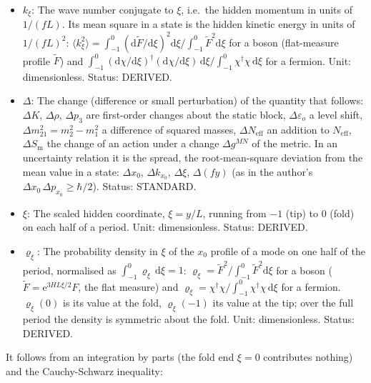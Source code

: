 \documentclass[
  10pt,
]{article}
\providecommand{\tightlist}{%
  \setlength{\itemsep}{0pt}\setlength{\parskip}{0pt}}
\begin{document}
\begin{itemize}
\tightlist
\item
  \(k_\xi\): The wave number conjugate to \(\xi\), i.e.~the hidden
  momentum in units of \(1/(fL)\). Its mean square in a state is the
  hidden kinetic energy in units of \(1/(fL)^2\):
  \(\langle k_\xi^2\rangle = \int_{-1}^{0}(\mathrm{d}\tilde F/\mathrm{d}\xi)^2\mathrm{d}\xi\big/\int_{-1}^{0}\tilde F^2\mathrm{d}\xi\)
  for a boson (flat-measure profile \(\tilde F\)) and
  \(\int_{-1}^{0}(\mathrm{d}\chi/\mathrm{d}\xi)^\dagger(\mathrm{d}\chi/\mathrm{d}\xi)\,\mathrm{d}\xi\big/\int_{-1}^{0}\chi^\dagger\chi\,\mathrm{d}\xi\)
  for a fermion. Unit: dimensionless. Status: DERIVED.
\item
  \(\Delta\): The change (difference or small perturbation) of the
  quantity that follows: \(\Delta K\), \(\Delta\rho\), \(\Delta p_3\)
  are first-order changes about the static block,
  \(\Delta\varepsilon_o\) a level shift,
  \(\Delta m^2_{21} = m_2^2 - m_1^2\) a difference of squared masses,
  \(\Delta N_{\mathrm{eff}}\) an addition to \(N_{\mathrm{eff}}\),
  \(\Delta S_{\mathrm{m}}\) the change of an action under a change
  \(\Delta g^{MN}\) of the metric. In an uncertainty relation it is the
  spread, the root-mean-square deviation from the mean value in a state:
  \(\Delta x_0\), \(\Delta k_{x_0}\), \(\Delta\xi\), \(\Delta(fy)\) (as
  in the author's \(\Delta x_0\,\Delta p_{x_0} \ge \hbar/2\)). Status:
  STANDARD.
\item
  \(\xi\): The scaled hidden coordinate, \(\xi = y/L\), running from
  \(-1\) (tip) to \(0\) (fold) on each half of a period. Unit:
  dimensionless. Status: DERIVED.
\item
  \(\varrho_\xi\): The probability density in \(\xi\) of the \(x_0\)
  profile of a mode on one half of the period, normalised as
  \(\int_{-1}^{0}\varrho_\xi\,\mathrm{d}\xi = 1\):
  \(\varrho_\xi = \tilde F^2/\int_{-1}^{0}\tilde F^2\mathrm{d}\xi\) for
  a boson (\(\tilde F = \mathrm{e}^{3HL\xi/2}F\), the flat measure) and
  \(\varrho_\xi = \chi^\dagger\chi/\int_{-1}^{0}\chi^\dagger\chi\,\mathrm{d}\xi\)
  for a fermion. \(\varrho_\xi(0)\) is its value at the fold,
  \(\varrho_\xi(-1)\) its value at the tip; over the full period the
  density is symmetric about the fold. Unit: dimensionless. Status:
  DERIVED.
\end{itemize}

It follows from an integration by parts (the fold end \(\xi = 0\)
contributes nothing) and the Cauchy-Schwarz inequality:
\end{document}
